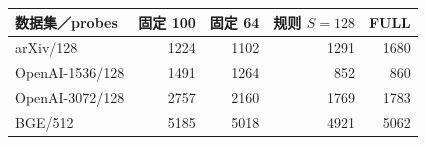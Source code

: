 \begin{tabular}{@{}lrrrr@{}}
\toprule
数据集／probes & 固定 100 & 固定 64 & 规则 $S=128$ & FULL \\
\midrule
arXiv/128 & 1224 & 1102 & 1291 & 1680 \\
OpenAI-1536/128 & 1491 & 1264 & 852 & 860 \\
OpenAI-3072/128 & 2757 & 2160 & 1769 & 1783 \\
BGE/512 & 5185 & 5018 & 4921 & 5062 \\
\bottomrule
\end{tabular}
